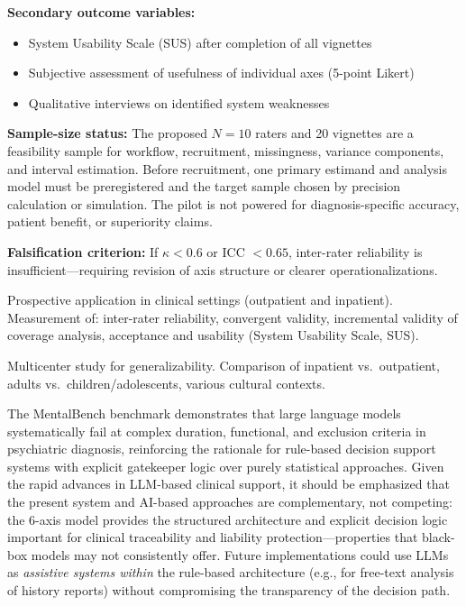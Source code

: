 \documentclass[11pt,a4paper]{article}
\begin{document}
\begin{description}[style=nextline, leftmargin=1.5cm, font=\bfseries]
\textbf{Secondary outcome variables:}
\begin{itemize}[leftmargin=*, noitemsep]
    \item System Usability Scale (SUS) after completion of all vignettes
    \item Subjective assessment of usefulness of individual axes (5-point Likert)
    \item Qualitative interviews on identified system weaknesses
\end{itemize}

\textbf{Sample-size status:} The proposed $N=10$ raters and 20 vignettes are a feasibility sample for workflow, recruitment, missingness, variance components, and interval estimation. Before recruitment, one primary estimand and analysis model must be preregistered and the target sample chosen by precision calculation or simulation. The pilot is not powered for diagnosis-specific accuracy, patient benefit, or superiority claims.

\textbf{Falsification criterion:} If $\kappa < 0.6$ or ICC $< 0.65$, inter-rater reliability is insufficient---requiring revision of axis structure or clearer operationalizations.

\item[Phase~3: Clinical Field Trial (N=200+)] Prospective application in clinical settings (outpatient and inpatient). Measurement of: inter-rater reliability, convergent validity, incremental validity of coverage analysis, acceptance and usability (System Usability Scale, SUS).
\item[Phase~4: Multi-Site Trial] Multicenter study for generalizability. Comparison of inpatient vs.\ outpatient, adults vs.\ children/adolescents, various cultural contexts.
\end{description}

The MentalBench benchmark \citep{Song2026MentalBench} demonstrates that large language models systematically fail at complex duration, functional, and exclusion criteria in psychiatric diagnosis, reinforcing the rationale for rule-based decision support systems with explicit gatekeeper logic over purely statistical approaches. Given the rapid advances in LLM-based clinical support, it should be emphasized that the present system and AI-based approaches are complementary, not competing: the 6-axis model provides the structured architecture and explicit decision logic important for clinical traceability and liability protection---properties that black-box models may not consistently offer. Future implementations could use LLMs as \textit{assistive systems within} the rule-based architecture (e.g., for free-text analysis of history reports) without compromising the transparency of the decision path.
\end{document}
